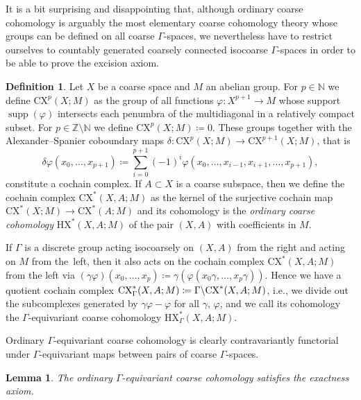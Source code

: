 \documentclass[pdftex]{sigma}
\numberwithin{equation}{section}
\newtheorem{lem}[thm]{Lemma}
\theoremstyle{definition}
\newtheorem{defn}[thm]{Definition}
\newcommand{\N}{\mathbb{N}}
\newcommand{\Z}{\mathbb{Z}}
\DeclareMathOperator{\supp}{supp}
\newcommand{\HX}{\mathrm{HX}}
\newcommand{\CX}{\mathrm{CX}}
\begin{document}
It is a bit surprising and disappointing that, although ordinary coarse cohomology is arguably the most elementary coarse cohomology theory whose groups can be defined on all coarse $\Gamma$-spaces, we nevertheless have to restrict ourselves to countably generated coarsely connected isocoarse $\Gamma$-spaces in order to be able to prove the excision axiom.



\begin{defn}
Let $X$ be a coarse space and $M$ an abelian group. For $p\in\N$ we define $\CX^p(X;M)$ as the group of all functions $\varphi\colon X^{p+1}\to M$ whose support \(\supp(\varphi)\) intersects each penumbra of the multidiagonal in a relatively compact subset.
For $p\in\Z\setminus\N$ we define $\CX^p(X;M)\coloneqq 0$.
These groups together with the Alexander--Spanier coboundary maps $\delta\colon\CX^p(X;M)\to\CX^{p+1}(X;M)$, that is
\begin{equation*}%
\delta\varphi(x_0,\dots,x_{p+1})\coloneqq\sum_{i=0}^{p+1}(-1)^i\varphi(x_0,\dots,x_{i-1},x_{i+1},\dots,x_{p+1}),
\end{equation*}
constitute a cochain complex.
If $A\subset X$ is a coarse subspace, then we define the cochain complex $\CX^*(X,A;M)$ as the kernel of the surjective cochain map $\CX^*(X;M)\to \CX^*(A;M)$ and its cohomology is the \emph{ordinary coarse cohomology} $\HX^*(X,A;M)$ of the pair $(X,A)$ with coefficients in $M$.

If $\Gamma$ is a discrete group acting isocoarsely on $(X,A)$ from the right and acting on $M$ from the~left, then it also acts on the cochain complex $\CX^*(X,A;M)$ from the left via $(\gamma\varphi)(x_0,\dots,x_p)\allowbreak\coloneqq \gamma(\varphi( x_0\gamma,\dots,x_p\gamma))$. Hence we have a quotient cochain complex
$\CX_\Gamma^*(X,A;M)\coloneqq\linebreak\Gamma\backslash\CX^*(X,A;M)$,
i.e., we divide out the subcomplexes generated by $\gamma\varphi-\varphi$ for all $\gamma$, $\varphi$, and we call its cohomology the $\Gamma$-equivariant coarse cohomology $\HX_\Gamma^*(X,A;M)$.
\end{defn}

Ordinary $\Gamma$-equivariant coarse cohomology is clearly contravariantly functorial under $\Gamma$-equivariant maps between pairs of coarse $\Gamma$-spaces.

\begin{lem}
The ordinary $\Gamma$-equivariant coarse cohomology satisfies the exactness axiom.
\end{lem}
\end{document}
